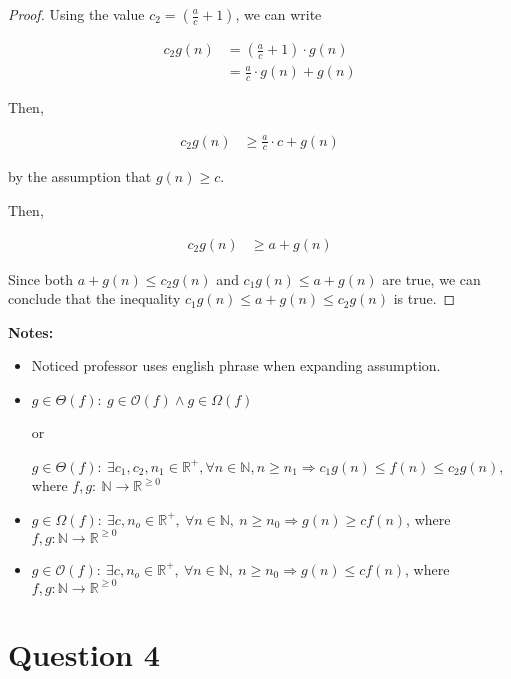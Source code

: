 \documentclass[12pt]{article}
\begin{document}
\begin{itemize}
\begin{proof}
        \bigskip

        Using the value $c_2 = \left( \frac{a}{c} + 1 \right)$, we can write

        \begin{align}
            c_2g(n) &= \left( \frac{a}{c} + 1 \right) \cdot g(n)\\
            &= \frac{a}{c} \cdot g(n) + g(n)
        \end{align}

        \bigskip

        Then,

        \begin{align}
            c_2g(n) &\geq \frac{a}{c} \cdot c + g(n)
        \end{align}

        by the assumption that $g(n) \geq c$.

        \bigskip

        Then,

        \begin{align}
            c_2g(n) &\geq a + g(n)
        \end{align}

        \bigskip

        Since both $a + g(n) \leq c_2g(n)$ and $c_1g(n) \leq a + g(n)$ are true,
        we can conclude that the inequality $c_1g(n) \leq  a + g(n) \leq c_2g(n)$ is true.

    \end{proof}

    \bigskip

    \textbf{Notes:}

    \begin{itemize}
        \item Noticed professor uses english phrase when expanding assumption.

        \item
        $g \in \Theta(f):\: g \in \mathcal{O}(f) \land g \in \Omega(f)$

        or

        $g \in \Theta(f):\:\exists c_1,c_2,n_1 \in \mathbb{R}^{+}, \forall n \in \mathbb{N}, n \geq n_1
        \Rightarrow c_1g(n) \leq f(n) \leq c_2g(n)$, where $f,g:\:\mathbb{N} \to \mathbb{R}^{\geq 0}$

        \item
        $g \in \Omega(f):\:\exists c,n_o \in \mathbb{R}^{+},\:\forall n \in
        \mathbb{N},\:n \geq n_0 \Rightarrow g(n) \geq cf(n)$, where $f,g:\mathbb{N} \to \mathbb{R}^{\geq 0}$

        \item

        $g \in \mathcal{O}(f):\:\exists c,n_o \in \mathbb{R}^{+},\:\forall n \in
        \mathbb{N},\:n \geq n_0 \Rightarrow g(n) \leq cf(n)$, where $f,g:\mathbb{N} \to \mathbb{R}^{\geq 0}$

    \end{itemize}
\end{itemize}

\section*{Question 4}
\end{document}
